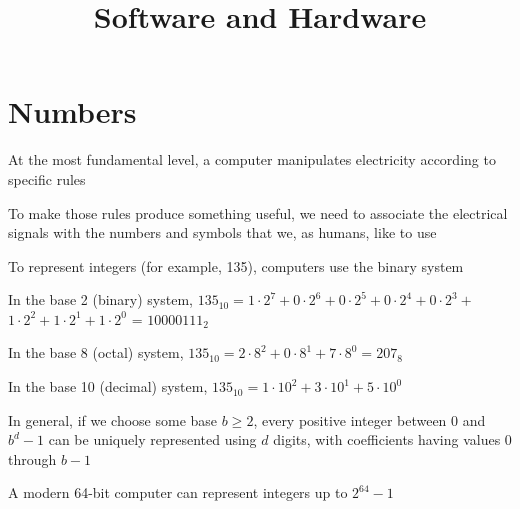 \documentclass[8pt,a4paper,compress]{beamer}
\title{Software and Hardware}
\date{}
\begin{document}
\begin{frame}
\vfill
\titlepage
\end{frame}

\section{Numbers}
\begin{frame}[fragile]
\pause

At the most fundamental level, a computer manipulates electricity according to specific rules

\pause
\bigskip

To make those rules produce something useful, we need to associate the electrical signals with the numbers and symbols that we, as humans, like to use

\pause
\bigskip

To represent integers (for example, 135), computers use the binary system

\pause
\bigskip

In the base 2 (binary) system, $135_{10} = 1 \cdot 2^7 + 0 \cdot 2^6 + 0 \cdot 2^5 + 0 \cdot 2^4 + 0 \cdot 2^3 + $ $1 \cdot 2^2 + 1 \cdot 2^1 + 1 \cdot 2^0$ = $10000111_{2}$

\pause
\bigskip

In the base 8 (octal) system, $135_{10} = 2 \cdot 8^2 + 0 \cdot 8^1 + 7 \cdot 8^0 = 207_{8}$

\pause
\bigskip

In the base 10 (decimal) system, $135_{10} = 1 \cdot 10^2 + 3 \cdot 10^1 + 5 \cdot 10^0$

\pause
\bigskip

In general, if we choose some base $b \geq 2$, every positive integer between 0 and $b^d-1$ can be uniquely represented using $d$ digits, with coefficients having values 0 through $b-1$

\pause
\bigskip

A modern 64-bit computer can represent integers up to $2^{64} - 1$
\end{frame}
\end{document}
